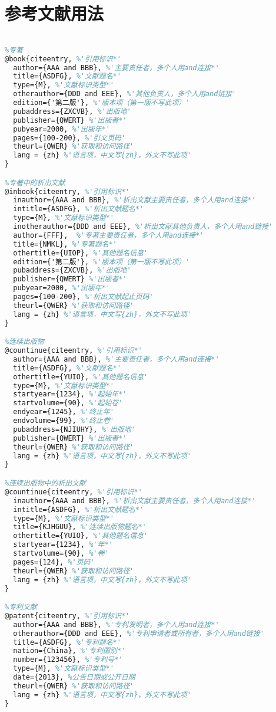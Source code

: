 \section{参考文献用法}
\begin{lstlisting}[language=tex,escapeinside='']
%'下面提到的项，带*的是必有的，其他的选填'

%专著
@book{citeentry, %'引用标识*'
  author={AAA and BBB}, %'主要责任者，多个人用and连接*'
  title={ASDFG}, %'文献题名*'
  type={M}, %'文献标识类型*'
  otherauthor={DDD and EEE}, %'其他负责人，多个人用and链接'
  edition={'第二版'}, %'版本项（第一版不写此项）'
  pubaddress={ZXCVB}, %'出版地'
  publisher={QWERT} %'出版者*'
  pubyear=2000, %'出版年*'
  pages={100-200}, %'引文页码'
  theurl={QWER} %'获取和访问路径'
  lang = {zh} %'语言项，中文写{zh}，外文不写此项'
}

%专著中的析出文献
@inbook{citeentry, %'引用标识*'
  inauthor={AAA and BBB}, %'析出文献主要责任者，多个人用and连接*'
  intitle={ASDFG}, %'析出文献题名*'
  type={M}, %'文献标识类型*'
  inotherauthor={DDD and EEE}, %'析出文献其他负责人，多个人用and链接'
  author={FFF},  %'专著主要责任者，多个人用and连接*'
  title={NMKL}, %'专著题名*'
  othertitle={UIOP}, %'其他题名信息'
  edition={'第二版'}, %'版本项（第一版不写此项）'
  pubaddress={ZXCVB}, %'出版地'
  publisher={QWERT} %'出版者*'
  pubyear=2000, %'出版年*'
  pages={100-200}, %'析出文献起止页码'
  theurl={QWER} %'获取和访问路径'
  lang = {zh} %'语言项，中文写{zh}，外文不写此项'
}

%连续出版物
@countinue{citeentry, %'引用标识*'
  author={AAA and BBB}, %'主要责任者，多个人用and连接*'
  title={ASDFG}, %'文献题名*'
  othertitle={YUIO}, %'其他题名信息'
  type={M}, %'文献标识类型*'
  startyear={1234}, %'起始年*'
  startvolume={90}, %'起始卷'
  endyear={1245}, %'终止年'
  endvolume={99}, %'终止卷'
  pubaddress={NJIUHY}, %'出版地'
  publisher={QWERT} %'出版者*'
  theurl={QWER} %'获取和访问路径'
  lang = {zh} %'语言项，中文写{zh}，外文不写此项'
}

%连续出版物中的析出文献
@countinue{citeentry, %'引用标识*'
  inauthor={AAA and BBB}, %'析出文献主要责任者，多个人用and连接*'
  intitle={ASDFG}, %'析出文献题名*'
  type={M}, %'文献标识类型*'
  title={KJHGUU}, %'连续出版物题名*'
  othertitle={YUIO}, %'其他题名信息'
  startyear={1234}, %'年*'
  startvolume={90}, %'卷'
  pages={124}, %'页码'
  theurl={QWER} %'获取和访问路径'
  lang = {zh} %'语言项，中文写{zh}，外文不写此项'
}

%专利文献
@patent{citeentry, %'引用标识*'
  author={AAA and BBB}, %'专利发明者，多个人用and连接*'
  otherauthor={DDD and EEE}, %'专利申请者或所有者，多个人用and链接'
  title={ASDFG}, %'专利题名*'
  nation={China}, %'专利国别*'
  number={123456}, %'专利号*'
  type={M}, %'文献标识类型*'
  date={2013}, %公告日期或公开日期
  theurl={QWER} %'获取和访问路径'
  lang = {zh} %'语言项，中文写{zh}，外文不写此项'
}


\end{lstlisting}
